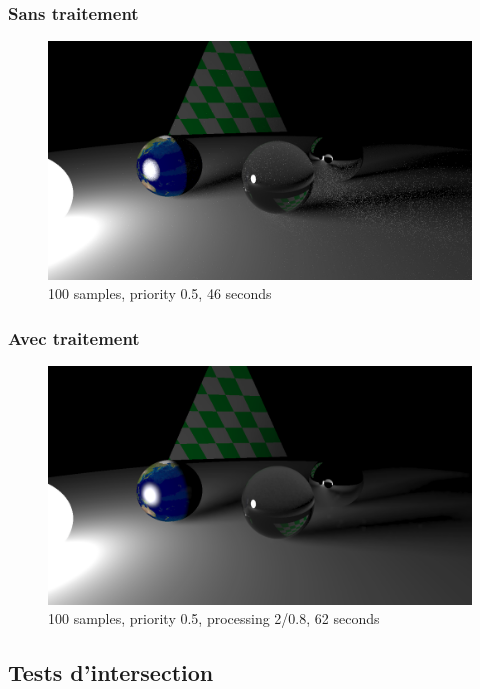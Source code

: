\documentclass[handout]{beamer}
\begin{document}
\begin{frame}
    \frametitle{Sans traitement}

    \begin{figure}
        \includegraphics[scale=0.25]{priorisation.png}
        \caption{100 samples, priority 0.5, 46 seconds}
    \end{figure}

\end{frame}

\begin{frame}
    \frametitle{Avec traitement}

    \begin{figure}
        \includegraphics[scale=0.25]{processing.png}
        \caption{100 samples, priority 0.5, processing 2/0.8, 62 seconds}
    \end{figure}

\end{frame}

\subsection{Tests d'intersection}
\end{document}
